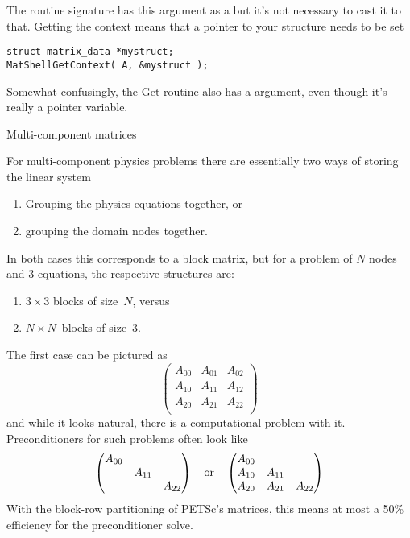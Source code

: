 The routine signature
has this argument as a  but it's not necessary to
cast it to that. Getting the context means that a pointer to your
structure needs to be set
\begin{lstlisting}
struct matrix_data *mystruct;
MatShellGetContext( A, &mystruct );
\end{lstlisting}
Somewhat confusingly, the Get routine also has a 
argument, even though it's really a pointer variable.

 {Multi-component matrices}
\label{sec:matfieldsplit}

For multi-component physics problems there are essentially
two ways of storing the linear system
\begin{enumerate}
\item Grouping the physics equations together, or
\item grouping the domain nodes together.
\end{enumerate}
In both cases this corresponds to a block matrix, but
for a problem of $N$ nodes and $3$ equations, the
respective structures are:
\begin{enumerate}
\item $3\times 3 $ blocks of size~$N$, versus
\item $N\times N$~blocks of size~$3$.
\end{enumerate}
The first case can be pictured as
\[ 
\begin{pmatrix}
  A_{00}&A_{01}&A_{02}\\ A_{10}&A_{11}&A_{12}\\ A_{20}&A_{21}&A_{22}\\ 
\end{pmatrix}
\]
and while it looks natural, there is a computational problem with it.
Preconditioners for such problems often look like
\[ 
\begin{pmatrix}
  A_{00}&\\ &A_{11}&\\ &&A_{22}\\ 
\end{pmatrix}
\quad\hbox{or}\quad
\begin{pmatrix}
  A_{00}&&\\ A_{10}&A_{11}&\\ A_{20}&A_{21}&A_{22}\\ 
\end{pmatrix}
\]
With the block-row partitioning of PETSc's matrices, this means
at most a 50\% efficiency for the preconditioner solve.

